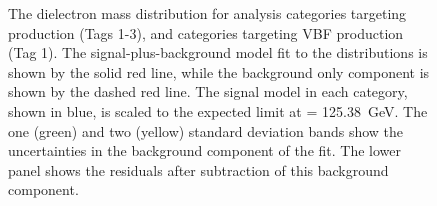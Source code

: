 \begin{figure}[htbp!]
\caption[The observed dielectron invariant mass distribution for the \ggH Tag 1-3 and VBF Tag 0 analysis categories.]{The dielectron mass distribution for analysis categories targeting \ggH production (Tags 1-3), and categories targeting VBF production (Tag 1). The signal-plus-background model fit to the distributions is shown by the solid red line, while the background only component is shown by the dashed red line. The signal model in each category, shown in blue, is scaled to the expected limit at \mH= 125.38~GeV. The one (green) and two (yellow) standard deviation bands show the uncertainties in the background component of the fit. The lower panel shows the residuals after subtraction of this background component.} 
\label{fig:app_splusb}            
\end{figure}